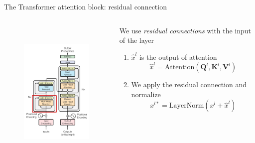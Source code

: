 \documentclass[12pt,aspectratio=169,handout]{beamer}
\newcounter{saveenumi}
\newcommand{\seti}{\setcounter{saveenumi}{\value{enumi}}}
\begin{document}
\begin{frame}{The Transformer attention block: residual connection}

	\begin{columns}[T]
		\begin{column}{.48\textwidth}
	
			\begin{figure}[h]
				\includegraphics[height=7cm]{anno_trf_hlattn.png}
			\end{figure}
			\end{column}
			\begin{column}{.48\textwidth}
				We use \textit{residual connections} with the input of the layer
				\begin{enumerate}
					\item $\hat{x}^l$ is the output of attention
					$$ 
						\hat{x}^l = \text{Attention} (\bm{Q}^l,\bm{K}^l,\bm{V}^l)
					$$
					\item We apply the residual connection and normalize
					$$
						x^{l*} = \text{LayerNorm} ( x^l + \hat{x}^l )
					$$
					\seti
				\end{enumerate}
			\end{column}
		\end{columns}

\end{frame}
\end{document}
